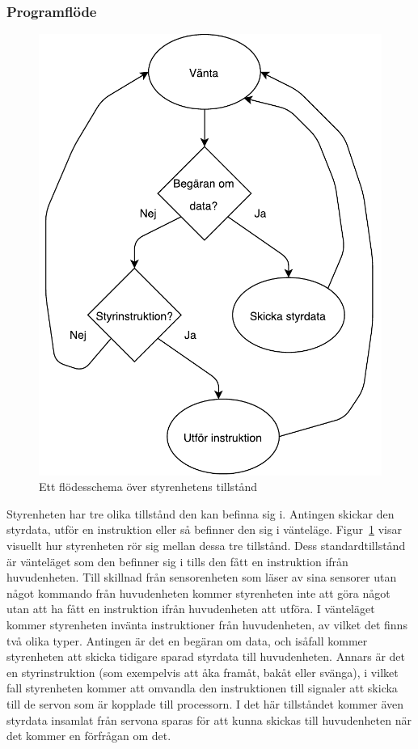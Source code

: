 \documentclass{article}
\begin{document}
\subsubsection{Programflöde}

\begin{figure}[H]
\centering
\includegraphics[scale=0.6]{styrenhet_flowchart}
\caption{Ett flödesschema över styrenhetens tillstånd}
\label{fig:styrenhet_flowchart}
\end{figure}
Styrenheten har tre olika tillstånd den kan befinna sig i. Antingen skickar den styrdata, utför en instruktion eller så befinner den sig i vänteläge. Figur~\ref{fig:styrenhet_flowchart} visar visuellt hur styrenheten rör sig mellan dessa tre tillstånd. Dess standardtillstånd är vänteläget som den befinner sig i tills den fått en instruktion ifrån huvudenheten. Till skillnad från sensorenheten som läser av sina sensorer utan något kommando från huvudenheten kommer styrenheten inte att göra något utan att ha fått en instruktion ifrån huvudenheten att utföra. I vänteläget kommer styrenheten invänta instruktioner från huvudenheten, av vilket det finns två olika typer. Antingen är det en begäran om data, och isåfall kommer styrenheten att skicka tidigare sparad styrdata till huvudenheten. Annars är det en styrinstruktion (som exempelvis att åka framåt, bakåt eller svänga), i vilket fall styrenheten kommer att omvandla den instruktionen till signaler att skicka till de servon som är kopplade till processorn. I det här tillståndet kommer även styrdata insamlat från servona sparas för att kunna skickas till huvudenheten när det kommer en förfrågan om det.
\clearpage
\end{document}
